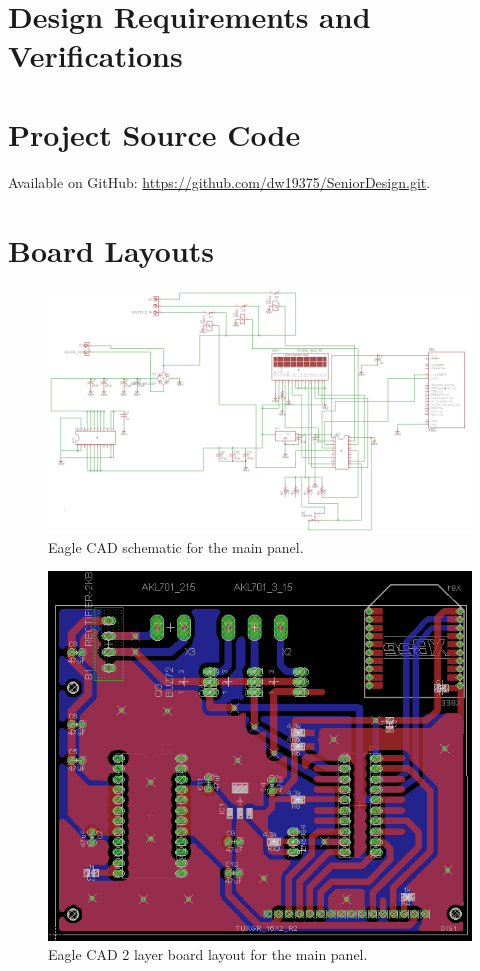 \appendix
\pagebreak
\section{Design Requirements and Verifications}
\label{reqtab}



\pagebreak
\section{Project Source Code}
Available on GitHub: \url{https://github.com/dw19375/SeniorDesign.git}.

\pagebreak
\section{Board Layouts}

\begin{figure}[htb]
\centering
\includegraphics[width=.99\textwidth]{mainboard_schematic.png}
\caption{Eagle CAD schematic for the main panel.}
\label{fig:mainboard_schematic}
\end{figure}

\begin{figure}[htb]
\centering
\includegraphics[width=.99\textwidth]{mainboard_layout.png}
\caption{Eagle CAD 2 layer board layout for the main panel.}
\label{fig:mainboard_layout}
\end{figure}


